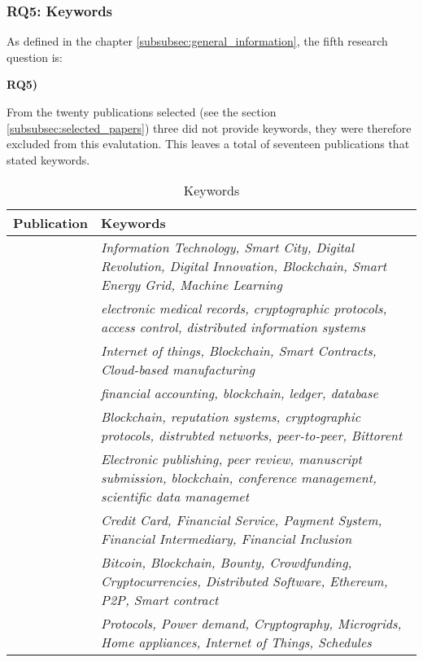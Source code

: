 \subsubsection{RQ5: Keywords}
\label{subsubsec:rq5_keywords}
As defined in the chapter \ref{subsubsec:general_information}, the fifth research question is:
\begin{displayquote}
\textbf{RQ5) }
\end{displayquote}
From the twenty publications selected (see the section \ref{subsubsec:selected_papers}) three \cite{2017_Liu,2018_Lucena,2017_Tackmann} did not provide keywords, they were therefore excluded from this evalutation. This leaves a total of seventeen publications that stated keywords.
\begin{longtable}{ |c|p{9cm}| }
	\caption{Keywords} \\
	\hline
 	\textbf{Publication} & \textbf{Keywords} \\ [0.5ex] 
 	\hline\hline
 	\citet{2018_Alessandra} & \textit{Information Technology, Smart City, Digital Revolution, Digital Innovation, Blockchain, Smart Energy Grid, Machine Learning}\\ 
	 \hline
	  \citet{2016_Azaria} & \textit{electronic medical records, cryptographic protocols, access control, distributed information systems} \\ 
	 \hline
	 \citet{2016_Bahga} & \textit{Internet of things, Blockchain, Smart Contracts, Cloud-based manufacturing}\\ 
	 \hline
	 \citet{2017_Coyne} & \textit{financial accounting, blockchain, ledger, database}\\ 
	 \hline
	 \citet{2015_Dennis} & \textit{Blockchain, reputation systems, cryptographic protocols, distrubted networks, peer-to-peer, Bittorent} \\ 
	 \hline
	 \citet{2017_Gipp} & \textit{Electronic publishing,
peer review, manuscript   submission, blockchain, conference management, scientific data managemet} \\ 
	 \hline
	 \citet{2017_Jaag} & \textit{Credit Card, Financial Service, Payment System, Financial Intermediary, Financial Inclusion } \\ 
	 \hline
	 \citet{2016_Jacynycz} & \textit{Bitcoin, Blockchain, Bounty, Crowdfunding, Cryptocurrencies, Distributed Software, Ethereum, P2P, Smart contract} \\ 
	 \hline
	 \citet{2016_Kianmajd} & \textit{Protocols, Power demand, Cryptography, Microgrids, Home appliances, Internet of Things, Schedules} \\ 

\end{longtable}
